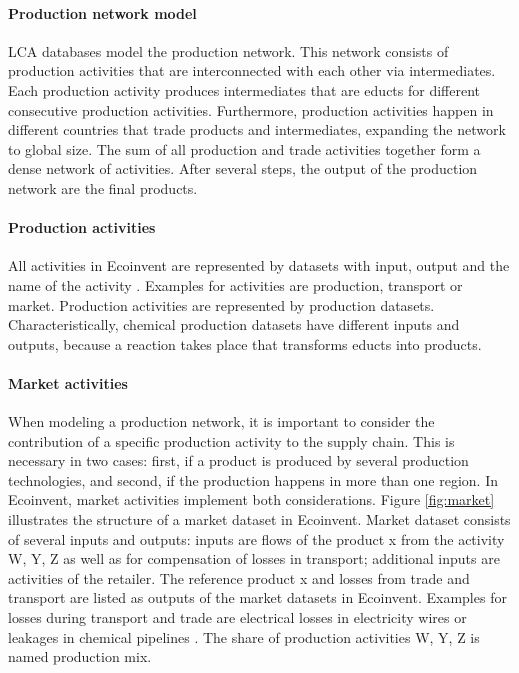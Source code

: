 \paragraph{Production network model}LCA databases model the production network.  This network consists of production activities that are interconnected with each other via intermediates. Each production  activity produces intermediates that are educts for different consecutive production activities. Furthermore, production activities happen in different countries that trade products and intermediates, expanding the network to global size. The sum of all production and trade activities together form a dense network of activities. After several steps, the output of the production network are the final products.

\paragraph{Production activities}All activities in Ecoinvent are represented by datasets with input, output and the name of the activity \cite{Wernet.2016}. Examples for activities are production, transport or market. Production activities are represented by production datasets. Characteristically, chemical production datasets have different inputs and outputs, because a reaction takes place that transforms educts into products.

\paragraph{Market activities}
When modeling a production network, it is important to consider the contribution of a specific production activity to the supply chain. This is necessary in two cases: first, if a product is produced by several production technologies, and second, if the production happens in more than one region. In Ecoinvent, market activities implement both considerations. Figure \ref{fig:market} illustrates the structure of a market dataset in Ecoinvent. Market dataset consists of several inputs and outputs: inputs are flows of the product x from the activity W, Y, Z as well as for compensation of losses in transport;  additional inputs are activities of the retailer. The reference product x and losses from trade and transport are listed as outputs of the market datasets in Ecoinvent. Examples for losses during transport and trade are electrical losses in electricity wires or leakages in chemical pipelines  \cite{Wernet.2016}.  The share of production activities W, Y, Z is named production mix.

